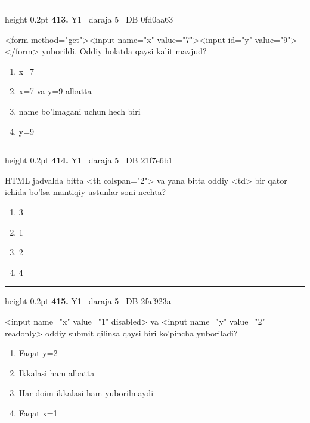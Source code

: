 \documentclass[10pt,a4paper,oneside]{article}
\begin{document}
\vspace{2mm}\hrule height 0.2pt \vspace{4mm}
\hypertarget{q413}{\textbf{\color{ink}413.}}  {\color{muted}\scriptsize Y1 \textbullet\ daraja 5 \textbullet\ DB 0fd0aa63}
\par
\textless{}form method="get"\textgreater{}\textless{}input name="x" value="7"\textgreater{}\textless{}input id="y" value="9"\textgreater{}\textless{}/form\textgreater{} yuborildi. Oddiy holatda qaysi kalit mavjud?
\begin{enumerate}[label=\Alph*),leftmargin=9mm]
\item x=7
\item x=7 va y=9 albatta
\item name bo'lmagani uchun hech biri
\item y=9
\end{enumerate}
\vspace{2mm}\hrule height 0.2pt \vspace{4mm}
\hypertarget{q414}{\textbf{\color{ink}414.}}  {\color{muted}\scriptsize Y1 \textbullet\ daraja 5 \textbullet\ DB 21f7e6b1}
\par
HTML jadvalda bitta \textless{}th colspan="2"\textgreater{} va yana bitta oddiy \textless{}td\textgreater{} bir qator ichida bo'lsa mantiqiy ustunlar soni nechta?
\begin{enumerate}[label=\Alph*),leftmargin=9mm]
\item 3
\item 1
\item 2
\item 4
\end{enumerate}
\vspace{2mm}\hrule height 0.2pt \vspace{4mm}
\hypertarget{q415}{\textbf{\color{ink}415.}}  {\color{muted}\scriptsize Y1 \textbullet\ daraja 5 \textbullet\ DB 2faf923a}
\par
\textless{}input name="x" value="1" disabled\textgreater{} va \textless{}input name="y" value="2" readonly\textgreater{} oddiy submit qilinsa qaysi biri ko'pincha yuboriladi?
\begin{enumerate}[label=\Alph*),leftmargin=9mm]
\item Faqat y=2
\item Ikkalasi ham albatta
\item Har doim ikkalasi ham yuborilmaydi
\item Faqat x=1
\end{enumerate}
\end{document}
